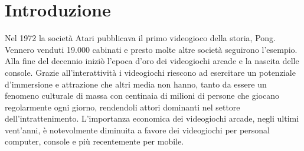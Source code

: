 %
%

\chapter{Introduzione}


Nel 1972 la società Atari pubblicava il primo videogioco della storia, Pong. Vennero venduti 19.000 cabinati e presto molte altre società seguirono l'esempio. Alla fine del decennio iniziò l'epoca d'oro dei videogiochi arcade e la nascita delle console. Grazie all'interattività i videogiochi riescono ad esercitare un potenziale d'immersione e attrazione che altri media non hanno, tanto da essere un fenomeno culturale di massa con centinaia di milioni di persone che giocano regolarmente ogni giorno, rendendoli attori dominanti nel settore dell'intrattenimento. L'importanza economica dei videogiochi arcade, negli ultimi vent'anni, è notevolmente diminuita a favore dei videogiochi per personal computer, console e più recentemente per mobile.

